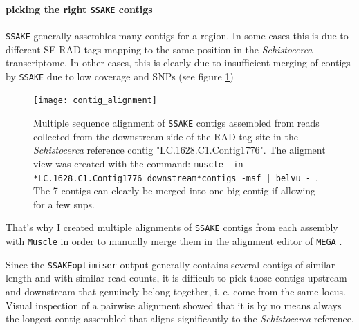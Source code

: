 \documentclass[a4paper,12pt,times,print,index,custombib,custommargin]{PhDThesisPSnPDF}\usepackage[]{graphicx}\usepackage[]{color}
\begin{document}
\paragraph{picking the right \texttt{SSAKE} contigs}\label{ch:picking_right_contig}
\texttt{SSAKE} generally assembles many contigs for a region. In some cases this is due to different SE \glspl{RAD tag} mapping to the same position in the \textit{Schistocerca} transcriptome. In other cases, this is clearly due to insufficient merging of contigs by \texttt{SSAKE} due to low coverage and SNPs (see figure \ref{contig_alignment})
%
\begin{figure}
\centering
\texttt{[image: contig\_alignment]}
\caption{Multiple sequence alignment of \texttt{SSAKE} contigs assembled from reads collected from the downstream side of the RAD tag site in the \textit{Schistocerca} reference contig "LC.1628.C1.Contig1776". The aligment view was created with the command: \texttt{muscle -in *LC.1628.C1.Contig1776\_downstream*contigs -msf | belvu -}~. The 7 contigs can clearly be merged into one big contig if allowing for a few \glspl{snp}.}
\label{contig_alignment}
\end{figure}
%
That's why I created multiple alignments of \texttt{SSAKE} contigs from each assembly with \texttt{Muscle} \citep{Edgar2004} in order to manually merge them in the alignment editor of \texttt{MEGA} \citep{Tamura2013}.

Since the \texttt{SSAKEoptimiser} output generally contains several \glspl{contig} of similar length and with similar read counts, it is difficult to pick those contigs upstream and downstream that genuinely belong together, i. e. come from the same locus. Visual inspection of a pairwise alignment showed that it is by no means always the longest \gls{contig} assembled that aligns significantly to the \textit{Schistocerca} reference.
\end{document}
